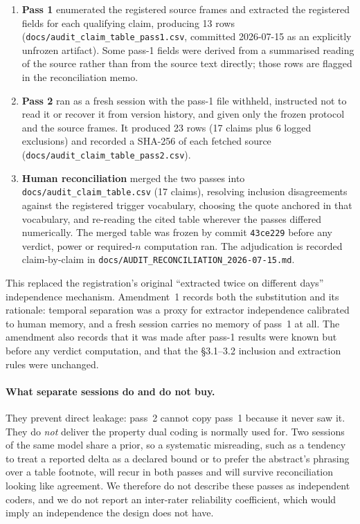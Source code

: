 \begin{enumerate}
\item \textbf{Pass 1} enumerated the registered source frames and extracted the
  registered fields for each qualifying claim, producing 13 rows
  (\texttt{docs/\allowbreak{}audit\_\allowbreak{}claim\_\allowbreak{}table\_\allowbreak{}pass1.csv}, committed 2026-07-15 as an
  explicitly unfrozen artifact). Some pass-1 fields were derived from a
  summarised reading of the source rather than from the source text directly;
  those rows are flagged in the reconciliation memo.
\item \textbf{Pass 2} ran as a fresh session with the pass-1 file withheld,
  instructed not to read it or recover it from version history, and given only
  the frozen protocol and the source frames. It produced 23 rows (17 claims
  plus 6 logged exclusions) and recorded a SHA-256 of each fetched source
  (\texttt{docs/\allowbreak{}audit\_\allowbreak{}claim\_\allowbreak{}table\_\allowbreak{}pass2.csv}).
\item \textbf{Human reconciliation} merged the two passes into
  \texttt{docs/\allowbreak{}audit\_\allowbreak{}claim\_\allowbreak{}table.csv} (17 claims), resolving inclusion
  disagreements against the registered trigger vocabulary, choosing the quote
  anchored in that vocabulary, and re-reading the cited table wherever the
  passes differed numerically. The merged table was frozen by commit
  \texttt{43ce229} before any verdict, power or required-$n$ computation ran.
  The adjudication is recorded claim-by-claim in
  \texttt{docs/\allowbreak{}AUDIT\_\allowbreak{}RECONCILIATION\_\allowbreak{}2026-07-15.md}.
\end{enumerate}

This replaced the registration's original ``extracted twice on different days''
independence mechanism. Amendment~1 records both the substitution and its
rationale: temporal separation was a proxy for extractor independence calibrated
to human memory, and a fresh session carries no memory of pass~1 at all. The
amendment also records that it was made after pass-1 results were known but
before any verdict computation, and that the \S3.1--3.2 inclusion and extraction
rules were unchanged.

\paragraph{What separate sessions do and do not buy.}
They prevent direct leakage: pass~2 cannot copy pass~1 because it never saw it.
They do \emph{not} deliver the property dual coding is normally used for. Two
sessions of the same model share a prior, so a systematic misreading, such as a
tendency to treat a reported delta as a declared bound or to prefer the
abstract's phrasing over a table footnote, will recur in both passes and will
survive reconciliation looking like agreement. We therefore do not describe
these passes as independent coders, and we do not report an inter-rater
reliability coefficient, which would imply an independence the design does not
have.


